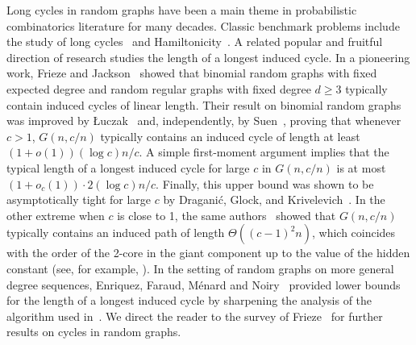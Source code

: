 \documentclass[reqno,a4paper]{amsart}
\theoremstyle{definition}
\begin{document}
Long cycles in random graphs have been a main theme in probabilistic combinatorics literature for many decades.
Classic benchmark problems include the study of long cycles~\cite{Ana23,ADEKKL25,AEKP25,AF21,CDEK24,EJ08,E-DLW24,Fri86,LMS26,Rio14} and Hamiltonicity~\cite{AKS85,B83a,B84,BJ26,CE-DGKO24,DMM-CPS24,FF84,KS83,K76,M19,NST19,P76,RW92,RW94,SV08}.
A related popular and fruitful direction of research studies the length of a longest induced cycle.
In a pioneering work, Frieze and Jackson~\cite{FJ87} showed that binomial random graphs with fixed expected degree and random regular graphs with fixed degree $d\ge 3$ typically contain induced cycles of linear length.
Their result on binomial random graphs was improved by Łuczak~\cite{L93} and, independently, by Suen~\cite{S92}, proving that whenever $c>1$, $G(n,c/n)$ typically contains an induced cycle of length at least $(1+o(1))(\log c)n/c$. A simple first‑moment argument implies that the typical length of a longest induced cycle for large $c$ in $G(n,c/n)$ is at most $(1+o_c(1))\cdot 2(\log c)n/c$. Finally, this upper bound was shown to be asymptotically tight for large $c$ by Draganić, Glock, and Krivelevich~\cite{DGK22}.
In the other extreme when $c$ is close to 1, the same authors~\cite{DGK22b} showed that $G(n,c/n)$ typically contains an induced path of length $\Theta((c-1)^2n)$, which coincides with the order of the 2-core in the giant component up to the value of the hidden constant (see, for example, \cite[Lemma 2.16]{FK15}).
In the setting of random graphs on more general degree sequences, Enriquez, Faraud, M\'enard and Noiry~\cite{EFMN21} provided lower bounds for the length of a longest induced cycle by sharpening the analysis of the algorithm used in~\cite{FJ87}.
We direct the reader to the survey of Frieze~\cite{F19} for further results on cycles in random graphs.
\end{document}
